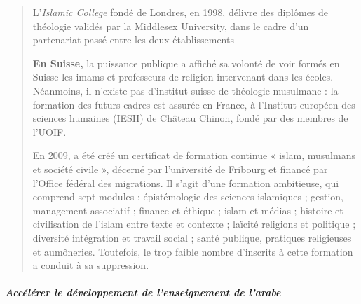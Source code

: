 \begin{quote}
L'\emph{Islamic College} fondé de Londres, en 1998, délivre des diplômes
de théologie validés par la Middlesex University, dans le cadre d'un
partenariat passé entre les deux établissements

\textbf{En Suisse,} la puissance publique a affiché sa volonté de voir
formés en Suisse les imams et professeurs de religion intervenant dans
les écoles. Néanmoins, il n'existe pas d'institut suisse de théologie
musulmane : la formation des futurs cadres est assurée en France, à
l'Institut européen des sciences humaines (IESH) de Château Chinon,
fondé par des membres de l'UOIF.

En 2009, a été créé un certificat de formation continue « islam,
musulmans et société civile », décerné par l'université de Fribourg et
financé par l'Office fédéral des migrations. Il s'agit d'une formation
ambitieuse, qui comprend sept modules : épistémologie des sciences
islamiques ; gestion, management associatif ; finance et éthique ; islam
et médias ; histoire et civilisation de l'islam entre texte et contexte
; laïcité religions et politique ; diversité intégration et travail
social ; santé publique, pratiques religieuses et aumôneries. Toutefois,
le trop faible nombre d'inscrits à cette formation a conduit à sa
suppression.
\end{quote}

\hypertarget{accuxe9luxe9rer-le-duxe9veloppement-de-lenseignement-de-larabe}{%
\subparagraph{Accélérer le développement de l'enseignement de
l'arabe}\label{accuxe9luxe9rer-le-duxe9veloppement-de-lenseignement-de-larabe}}

